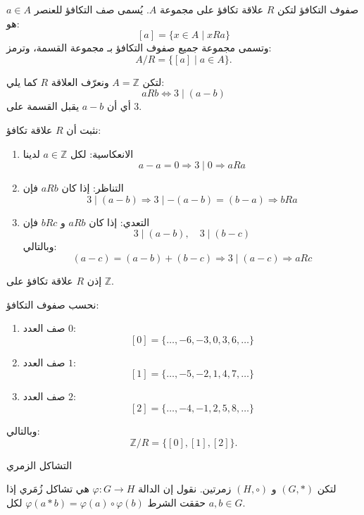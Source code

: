 \begin{definition}{صفوف التكافؤ}{\cite{ref1}}
	لتكن $R$ علاقة تكافؤ على مجموعة $A$. يُسمى صف التكافؤ للعنصر $a \in A$ هو:
	\[
	[a] = \{ x \in A \mid xRa \}
	\]
	وتسمى مجموعة جميع صفوف التكافؤ بـ مجموعة القسمة، وترمز:
	\[
	A / R = \{ [a] \mid a \in A \}.
	\]
\end{definition}

\begin{example}
	لتكن $A = \mathbb{Z}$ ونعرّف العلاقة $R$ كما يلي:
	\[
	aRb \iff 3 \mid (a - b)
	\]
	أي أن $a-b$ يقبل القسمة على $3$.
	
	نثبت أن $R$ علاقة تكافؤ:
	
	\begin{enumerate}
		\item الانعكاسية: لكل $a \in \mathbb{Z}$ لدينا
		\[
		a-a = 0 \Rightarrow 3 \mid 0 \Rightarrow aRa
		\]
		
		\item التناظر: إذا كان $aRb$ فإن
		\[
		3 \mid (a-b) \Rightarrow 3 \mid -(a-b) = (b-a) \Rightarrow bRa
		\]
		
		\item التعدي: إذا كان $aRb$ و $bRc$ فإن
		\[
		3 \mid (a-b), \quad 3 \mid (b-c)
		\]
		وبالتالي:
		\[
		(a-c) = (a-b) + (b-c) \Rightarrow 3 \mid (a-c) \Rightarrow aRc
		\]
	\end{enumerate}
	إذن $R$ علاقة تكافؤ على $\mathbb{Z}$.
	
	نحسب صفوف التكافؤ:
	
	\begin{enumerate}
		\item صف العدد $0$:
		\[
		[0] = \{ \dots, -6, -3, 0, 3, 6, \dots \}
		\]
		
		\item صف العدد $1$:
		\[
		[1] = \{ \dots, -5, -2, 1, 4, 7, \dots \}
		\]
		
		\item صف العدد $2$:
		\[
		[2] = \{ \dots, -4, -1, 2, 5, 8, \dots \}
		\]
	\end{enumerate}
	وبالتالي:
	\[
	\mathbb{Z}/R = \{ [0], [1], [2] \}.
	\]
\end{example}


\begin{definition}{التشاكل الزمري}{\cite{ref3}}
	لتكن $(G, *)$ و $(H, \circ)$ زمرتين. نقول إن الدالة $\varphi : G \to H$ هي تشاكل زُمَري إذا حققت الشرط
	 \linebreak$\varphi(a * b) = \varphi(a) \circ \varphi(b)$ لكل $a, b \in G$.
\end{definition}


